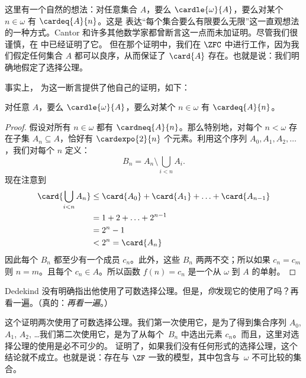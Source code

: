 \documentclass[../../../include/open-logic-section]{subfiles}
\begin{document}
\begin{ex}
这里有一个自然的想法：对任意集合 $A$，要么
$\cardle{\omega}{A}$，要么对某个 $n \in \omega$ 有 $\cardeq{A}{n}$。这是
表达“每个集合要么有限要么无限”这一直观想法的一种方式。Cantor 和许多其他数学家都曾断言这一点而未加证明。尽管我们很谨慎，在
 中已经证明了它。
但在那个证明中，我们在 $\ZFC$ 中进行工作，因为我们假定任何集合 $A$ 都可以良序，从而保证了 $\card{A}$ 存在。也就是说：我们明确地假定了选择公理。

事实上，\citet{Dedekind1888} 为这一断言提供了他自己的证明，如下：

\begin{thm}
对任意 $A$，要么 $\cardle{\omega}{A}$，要么对某个 $n \in \omega$ 有 $\cardeq{A}{n}$。
\end{thm}

\begin{proof}
假设对所有 $n \in \omega$ 都有 $\cardneq{A}{n}$。那么特别地，对每个
$n < \omega$ 存在子集 $A_n \subseteq A$，恰好有 $\cardexpo{2}{n}$ 个元素。利用这个序列 $A_0, A_1, A_2,
\ldots$，我们对每个 $n$ 定义：
\[
	B_n = A_n \setminus \bigcup_{i < n} A_i.
\]
现在注意到
\begin{align*}
	\card{\bigcup_{i < n}A_n}
	&\leq \card{A_0} + \card{A_1} + \ldots + \card{A_{n-1}}\\
	&=1 + 2 + \ldots + 2^{n-1}\\
	& = 2^n - 1\\
	& < 2^n = \card{A_n}
\end{align*}
因此每个 $B_n$ 都至少有一个成员 $c_n$。此外，这些 $B_n$ 两两不交；所以如果 $c_n = c_m$ 则 $n = m$。且每个 $c_n
\in A$。所以函数  $f(n) = c_n$ 是一个从 $\omega$ 到 $A$ 的单射。
\end{proof}
\noindent
Dedekind 没有明确指出他使用了可数选择公理。但是，\emph{你}发现它的使用了吗？再看一遍。（真的：\emph{再看一遍}。）

这个证明两次使用了可数选择公理。我们第一次使用它，是为了得到集合序列 $A_0$, $A_1$, $A_2$, \dots\@ 我们第二次使用它，是为了从每个~$B_n$ 中选出元素 $c_n$。而且，这里对选择公理的使用是必不可少的。\citet[p.~138]{Cohen1966} 证明了，如果我们没有任何形式的选择公理，这个结论就不成立。也就是说：存在与 $\ZF$ 一致的模型，其中包含与~$\omega$ 不可比较的集合。
\end{ex}
\end{document}
